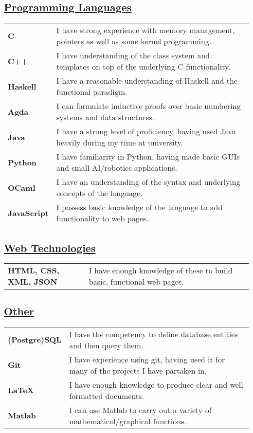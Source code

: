 \documentclass[11pt]{article}
\begin{document}
		\subsection*{\underline{Programming Languages}}
		\renewcommand{\arraystretch}{1.3}%
		\begin{tabular}[20pt]{ll}
			\textbf{C} & I have strong experience with memory management, pointers as well as some kernel programming. \\
			\textbf{C++} & I have understanding of the class system and templates on top of the underlying C functionality. \\
			\textbf{Haskell} & I have a reasonable understanding of Haskell and the functional paradigm.\\
			\textbf{Agda} & I can formulate inductive proofs over basic numbering systems and data structures.\\
			 \textbf{Java} &  I have a strong level of proficiency, having used Java heavily during my time at university.\\
			 \textbf{Python} & I have familiarity in Python, having made basic GUIs and small AI/robotics applications. \\
			 \textbf{OCaml} & I have an understanding of the syntax and underlying concepts of the language.\\
			\textbf{JavaScript} &  I possess basic knowledge of the language to add functionality to web pages.\\
		\end{tabular} 
		\subsection*{\underline{Web Technologies}}
		\renewcommand{\arraystretch}{1.3}%
		\begin{tabular}{ll}
			\textbf{HTML, CSS, XML, JSON} & I have enough knowledge of these to build basic, functional web pages.\\
		\end{tabular}
		\subsection*{\underline{Other}}
		\renewcommand{\arraystretch}{1.3}%
		\begin{tabular}{ll}
			\textbf{(Postgre)SQL} & I have the competency to define database entities and then query them.\\
			 \textbf{Git} & I have experience using git, having used it for many of the projects I have partaken in.\\
			\textbf{LaTeX} & I have enough knowledge to produce clear and well formatted documents.\\
			\textbf{Matlab} & I can use Matlab to carry out a variety of mathematical/graphical functions.\\
		\end{tabular}
	
\end{document}

